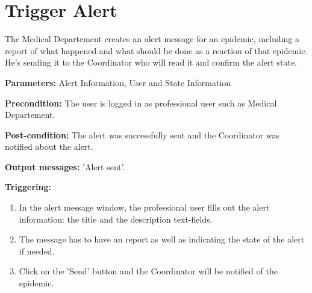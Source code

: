\section{Trigger Alert}
\label{operation:TriggerAlert}
The Medical Departement creates an alert message for an epidemic, including a
report of what happened and what should be done as a reaction of that epidemic.
He's sending it to the Coordinator who will read it and confirm the alert
state.\\
\begin{description}
\item \textbf{Parameters:} Alert Information, User and State Information
\item \textbf{Precondition:} The user is logged in as professional user such as
Medical Departement.
\item \textbf{Post-condition:}  The alert was successfully sent and the
Coordinator was notified about the alert.
\item \textbf{Output messages:} 'Alert sent'.
\item \textbf{Triggering:}
\begin{enumerate}
\item In the alert message window, the professional user fills out the alert
information: the title and the description text-fields.
\item The message has to have an report as well as indicating the state of the
alert if needed.
\item Click on the 'Send' button and the Coordinator will be notified of the
epidemic.
\end{enumerate}
\end{description}


